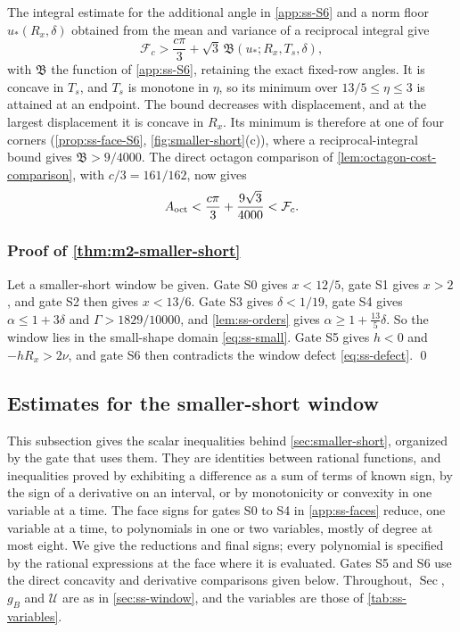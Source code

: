  The integral estimate for the additional angle in
\cref{app:ss-S6} and a norm floor $u_*(R_x,\delta)$ obtained from the mean and variance of a
reciprocal integral give
\[
  \mathcal F_c>\frac{c\pi}{3}+\sqrt3\,\mathfrak B(u_*;R_x,T_s,\delta),
\]
with $\mathfrak B$ the function of \cref{app:ss-S6}, retaining the exact fixed-row angles. It is
concave in $T_s$, and $T_s$ is monotone in $\eta$, so its minimum over $13/5\le\eta\le3$ is
attained at an endpoint. The bound decreases with displacement, and at the largest displacement
it is concave in $R_x$. Its minimum is therefore at one of four corners
(\cref{prop:ss-face-S6}, \cref{fig:smaller-short}(c)), where a reciprocal-integral bound gives
$\mathfrak B>9/4000$. The direct octagon comparison of
\cref{lem:octagon-cost-comparison}, with $c/3=161/162$, now gives
\[
 A_{\mathrm{oct}}<\frac{c\pi}{3}+\frac{9\sqrt3}{4000}<\mathcal F_c.
\]


\subsubsection{Proof of \texorpdfstring{\cref{thm:m2-smaller-short}}{the theorem}}\label{sec:ss-assembly}

Let a smaller-short window be given. Gate S0 gives $x<12/5$, gate S1 gives $x>2$, and gate S2
then gives $x<13/6$. Gate S3 gives $\delta<1/19$, gate S4 gives $\alpha\le1+3\delta$ and
$\Gamma>1829/10000$, and \cref{lem:ss-orders} gives $\alpha\ge1+\frac{13}{5}\delta$. So the
window lies in the small-shape domain \eqref{eq:ss-small}. Gate S5 gives $h<0$ and
$-hR_x>2\nu$, and gate S6 then contradicts the window defect \eqref{eq:ss-defect}. \qed

\subsection{Estimates for the smaller-short window}\label{app:short-estimates}

This subsection gives the scalar inequalities behind \cref{sec:smaller-short}, organized by the
gate that uses them. They are identities between rational functions, and inequalities proved by
exhibiting a difference as a sum of terms of known sign, by the sign of a derivative on an
interval, or by monotonicity or convexity in one variable at a time. The face signs for gates
S0 to S4 in \cref{app:ss-faces} reduce, one variable at a time, to polynomials in one or two
variables, mostly of degree at most eight. We give the reductions and final signs; every
polynomial is specified by the rational expressions at the face where it is evaluated.
Gates S5 and S6 use the direct concavity and derivative comparisons given below.
Throughout, $\operatorname{Sec}$, $g_B$ and $\mathcal U$ are as in \cref{sec:ss-window}, and the
variables are those of \cref{tab:ss-variables}.


